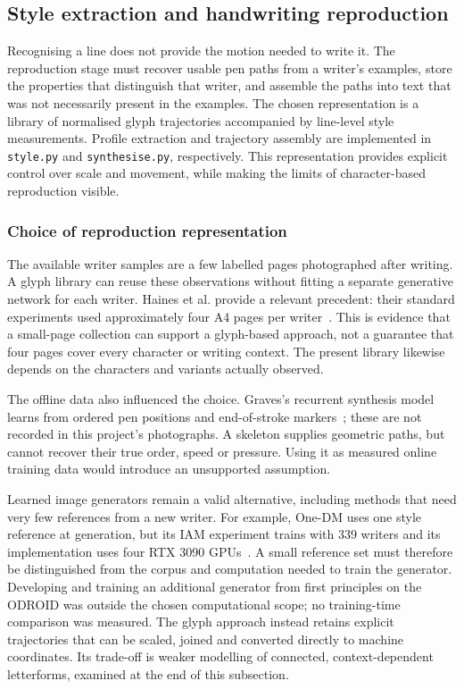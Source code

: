 \subsection{Style extraction and handwriting reproduction}
\label{sec:des-reproduction}
Recognising a line does not provide the motion needed to write it. The reproduction stage must recover usable pen paths from a writer's examples, store the properties that distinguish that writer, and assemble the paths into text that was not necessarily present in the examples. The chosen representation is a library of normalised glyph trajectories accompanied by line-level style measurements. Profile extraction and trajectory assembly are implemented in \texttt{style.py} and \texttt{synthesise.py}, respectively. This representation provides explicit control over scale and movement, while making the limits of character-based reproduction visible.


\subsubsection{Choice of reproduction representation}
The available writer samples are a few labelled pages photographed after writing. A glyph library can reuse these observations without fitting a separate generative network for each writer. Haines et al. provide a relevant precedent: their standard experiments used approximately four A4 pages per writer~\cite[PDF p.~4, Sec.~4]{haines2016}. This is evidence that a small-page collection can support a glyph-based approach, not a guarantee that four pages cover every character or writing context. The present library likewise depends on the characters and variants actually observed.

The offline data also influenced the choice. Graves's recurrent synthesis model learns from ordered pen positions and end-of-stroke markers~\cite[p.~18]{graves2013}; these are not recorded in this project's photographs. A skeleton supplies geometric paths, but cannot recover their true order, speed or pressure. Using it as measured online training data would introduce an unsupported assumption.

Learned image generators remain a valid alternative, including methods that need very few references from a new writer. For example, One-DM uses one style reference at generation, but its IAM experiment trains with 339 writers and its implementation uses four RTX 3090 GPUs~\cite[p.~9]{dai2024}. A small reference set must therefore be distinguished from the corpus and computation needed to train the generator. Developing and training an additional generator from first principles on the ODROID was outside the chosen computational scope; no training-time comparison was measured. The glyph approach instead retains explicit trajectories that can be scaled, joined and converted directly to machine coordinates. Its trade-off is weaker modelling of connected, context-dependent letterforms, examined at the end of this subsection.

